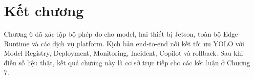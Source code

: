 \section{Kết chương}

Chương 6 đã xác lập bộ phép đo cho model, hai thiết bị Jetson, toàn bộ Edge
Runtime và các dịch vụ platform. Kịch bản end-to-end nối kết tối ưu YOLO với
Model Registry, Deployment, Monitoring, Incident, Copilot và rollback. Sau khi
điền số liệu thật, kết quả chương này là cơ sở trực tiếp cho các kết luận ở Chương 7.